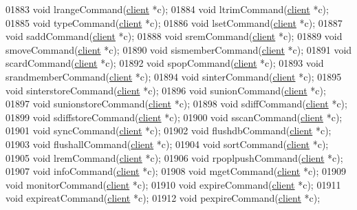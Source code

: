 \begin{DoxyCode}
{{{{{{{01883 \textcolor{keywordtype}{void} lrangeCommand(\hyperlink{structclient}{client} *c);
01884 \textcolor{keywordtype}{void} ltrimCommand(\hyperlink{structclient}{client} *c);
01885 \textcolor{keywordtype}{void} typeCommand(\hyperlink{structclient}{client} *c);
01886 \textcolor{keywordtype}{void} lsetCommand(\hyperlink{structclient}{client} *c);
01887 \textcolor{keywordtype}{void} saddCommand(\hyperlink{structclient}{client} *c);
01888 \textcolor{keywordtype}{void} sremCommand(\hyperlink{structclient}{client} *c);
01889 \textcolor{keywordtype}{void} smoveCommand(\hyperlink{structclient}{client} *c);
01890 \textcolor{keywordtype}{void} sismemberCommand(\hyperlink{structclient}{client} *c);
01891 \textcolor{keywordtype}{void} scardCommand(\hyperlink{structclient}{client} *c);
01892 \textcolor{keywordtype}{void} spopCommand(\hyperlink{structclient}{client} *c);
01893 \textcolor{keywordtype}{void} srandmemberCommand(\hyperlink{structclient}{client} *c);
01894 \textcolor{keywordtype}{void} sinterCommand(\hyperlink{structclient}{client} *c);
01895 \textcolor{keywordtype}{void} sinterstoreCommand(\hyperlink{structclient}{client} *c);
01896 \textcolor{keywordtype}{void} sunionCommand(\hyperlink{structclient}{client} *c);
01897 \textcolor{keywordtype}{void} sunionstoreCommand(\hyperlink{structclient}{client} *c);
01898 \textcolor{keywordtype}{void} sdiffCommand(\hyperlink{structclient}{client} *c);
01899 \textcolor{keywordtype}{void} sdiffstoreCommand(\hyperlink{structclient}{client} *c);
01900 \textcolor{keywordtype}{void} sscanCommand(\hyperlink{structclient}{client} *c);
01901 \textcolor{keywordtype}{void} syncCommand(\hyperlink{structclient}{client} *c);
01902 \textcolor{keywordtype}{void} flushdbCommand(\hyperlink{structclient}{client} *c);
01903 \textcolor{keywordtype}{void} flushallCommand(\hyperlink{structclient}{client} *c);
01904 \textcolor{keywordtype}{void} sortCommand(\hyperlink{structclient}{client} *c);
01905 \textcolor{keywordtype}{void} lremCommand(\hyperlink{structclient}{client} *c);
01906 \textcolor{keywordtype}{void} rpoplpushCommand(\hyperlink{structclient}{client} *c);
01907 \textcolor{keywordtype}{void} infoCommand(\hyperlink{structclient}{client} *c);
01908 \textcolor{keywordtype}{void} mgetCommand(\hyperlink{structclient}{client} *c);
01909 \textcolor{keywordtype}{void} monitorCommand(\hyperlink{structclient}{client} *c);
01910 \textcolor{keywordtype}{void} expireCommand(\hyperlink{structclient}{client} *c);
01911 \textcolor{keywordtype}{void} expireatCommand(\hyperlink{structclient}{client} *c);
01912 \textcolor{keywordtype}{void} pexpireCommand(\hyperlink{structclient}{client} *c);
}}}}}}}
\end{DoxyCode}
